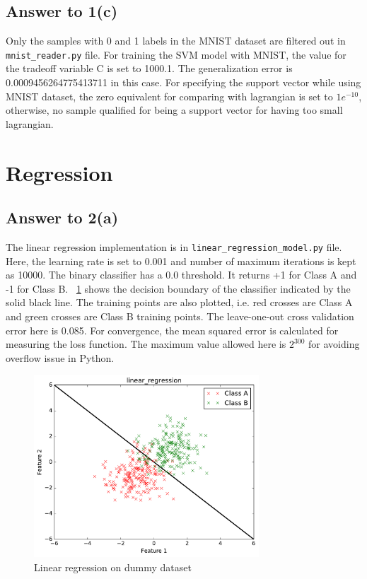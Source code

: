 \documentclass[runningheads]{llncs}
\begin{document}
\subsection{Answer to 1(c)}
Only the samples with 0 and 1 labels in the MNIST dataset are filtered out in \texttt{mnist\_reader.py} file.
For training the SVM model with MNIST, the value for the tradeoff variable C is set to 1000.1.
The generalization error is 0.0009456264775413711 in this case.
For specifying the support vector while using MNIST dataset, the zero equivalent for comparing with lagrangian is set to $1e^{-10}$,
otherwise, no sample qualified for being a support vector for having too small lagrangian.

\section{Regression}

\subsection{Answer to 2(a)}
The linear regression implementation is in \texttt{linear\_regression\_model.py} file. Here, the learning rate is
set to 0.001 and number of maximum iterations is kept as 10000. The binary classifier has a 0.0 threshold.
It returns +1 for Class A and -1 for Class B. \figurename~\ref{fig:linear_dummy} shows the decision boundary
of the classifier indicated by the solid black line. The training points are also plotted, i.e. red crosses are
Class A and green crosses are Class B training points. The leave-one-out cross validation error here is 0.085.
For convergence, the mean squared error is calculated for measuring the loss function. The maximum value
allowed here is $2^{300}$ for avoiding overflow issue in Python.
\begin{figure}
\centering
\includegraphics[width=0.75\textwidth]{linear_regression.pdf}
\caption{Linear regression on dummy dataset} \label{fig:linear_dummy}
\end{figure}
\end{document}
